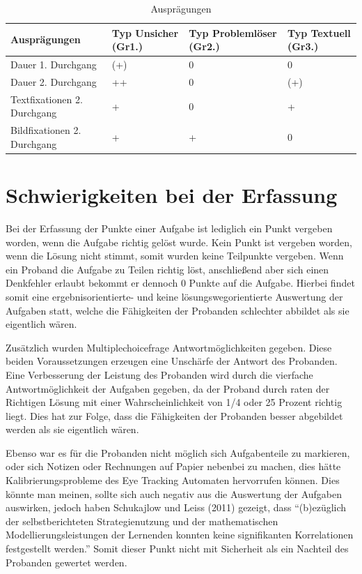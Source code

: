 \begin{table}[!h]
\hspace{-5pt}
\begin{tabularx}{\textwidth + 5pt}{| @{\hspace{3pt}} M || @{\hspace{3pt}} M  | @{\hspace{3pt}} M  | @{\hspace{3pt}} M |}
\hline
\textbf{Ausprägungen} & \textbf{Typ Unsicher (Gr1.)} & \textbf{Typ Problemlöser (Gr2.)} & \textbf{Typ Textuell (Gr3.)}\\
\hline
\hline
Dauer 1. Durchgang          & (+) & 0 & 0\\
\hline
Dauer 2. Durchgang          & ++ & 0 & (+)\\
\hline
Textfixationen 2. Durchgang & + & 0 & +\\
\hline
Bildfixationen 2. Durchgang & + & + & 0\\
\hline
\end{tabularx}
\caption{Ausprägungen}
\end{table}



\section{Schwierigkeiten bei der Erfassung}

Bei der Erfassung der Punkte einer Aufgabe ist lediglich ein Punkt vergeben worden, wenn die Aufgabe richtig gelöst wurde. Kein Punkt ist vergeben worden, wenn die Lösung nicht stimmt, somit wurden keine Teilpunkte vergeben. Wenn ein Proband die Aufgabe zu Teilen richtig löst, anschließend aber sich einen Denkfehler erlaubt bekommt er dennoch 0 Punkte auf die Aufgabe. Hierbei findet somit eine ergebnisorientierte- und keine lösungswegorientierte Auswertung der Aufgaben statt, welche die Fähigkeiten der Probanden schlechter abbildet als sie eigentlich wären.

Zusätzlich wurden Multiplechoicefrage Antwortmöglichkeiten gegeben. Diese beiden Voraussetzungen erzeugen eine Unschärfe der Antwort des Probanden. Eine Verbesserung der Leistung des Probanden wird durch die vierfache Antwortmöglichkeit der Aufgaben gegeben, da der Proband durch raten der Richtigen Lösung mit einer Wahrscheinlichkeit von 1/4 oder 25 Prozent richtig liegt. Dies hat zur Folge, dass die Fähigkeiten der Probanden besser abgebildet werden als sie eigentlich wären.  

Ebenso war es für die Probanden nicht möglich sich Aufgabenteile zu markieren, oder sich Notizen oder Rechnungen auf Papier nebenbei zu machen, dies hätte Kalibrierungsprobleme des Eye Tracking Automaten hervorrufen können. Dies könnte man meinen, sollte sich auch negativ aus die Auswertung der Aufgaben auswirken, jedoch haben Schukajlow und Leiss (2011) gezeigt, dass ``(b)ezüglich der selbstberichteten Strategienutzung und der mathematischen Modellierungsleistungen der Lernenden konnten keine signifikanten Korrelationen festgestellt werden\cite{schukajlow2011selbstberichtete}.'' Somit dieser Punkt nicht mit Sicherheit als ein Nachteil des Probanden gewertet werden. 

